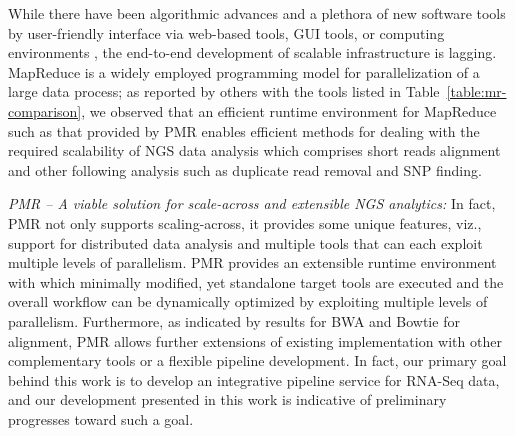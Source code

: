 \documentclass{acm_proc_article-sp}
\begin{document}

While there have been algorithmic advances and a plethora of new
software tools by user-friendly interface via web-based tools, GUI
tools, or computing environments \cite{galaxy}, the end-to-end
development of scalable infrastructure is lagging.  MapReduce is a
widely employed programming model for parallelization of a large data
process; as reported by others with the tools listed in
Table~\ref{table:mr-comparison}, we observed that an efficient 
runtime environment for MapReduce such as that provided by PMR 
enables efficient methods for dealing with the required
scalability of NGS data analysis which comprises short reads alignment
and other following analysis such as duplicate read removal and SNP
finding.



\textit{PMR -- A viable solution for scale-across and extensible NGS
  analytics:} In fact, PMR not only supports scaling-across, it
provides some unique features, viz., support for distributed data
analysis and multiple tools that can each exploit multiple levels of
parallelism. %
PMR provides an extensible runtime environment with which minimally
modified, yet standalone target tools are executed and the overall
workflow can be dynamically optimized by exploiting multiple levels of
parallelism. Furthermore, as indicated by results for BWA and Bowtie
for alignment, PMR allows further extensions of existing
implementation with other complementary tools or a flexible pipeline
development.  In fact, our primary goal behind this work is to develop
an integrative pipeline service for RNA-Seq data, and our development
presented in this work is indicative of preliminary progresses toward
such a goal.
\end{document}
